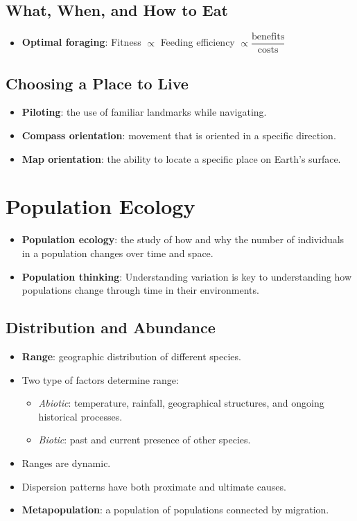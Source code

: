 \documentclass[12pt,a4paper]{article}
\begin{document}
\subsection{What, When, and How to Eat}
\begin{itemize}
    \item \textbf{Optimal foraging}: Fitness \(\propto\) Feeding efficiency \(\propto \dfrac{\text{benefits}}{\text{costs}}\)
\end{itemize}
\setcounter{subsection}{3}
\subsection{Choosing a Place to Live}
\begin{itemize}
    \item \textbf{Piloting}: the use of familiar landmarks while navigating.
    \item \textbf{Compass orientation}: movement that is oriented in a specific direction.
    \item \textbf{Map orientation}: the ability to locate a specific place on Earth's surface.
\end{itemize}

\clearpage
\section{Population Ecology}
\begin{itemize}
    \item \textbf{Population ecology}: the study of how and why the number of individuals in a population changes over time and space.
    \item \textbf{Population thinking}: Understanding variation is key to understanding how populations change through time in their environments.
\end{itemize}

\subsection{Distribution and Abundance}
\begin{itemize}
    \item \textbf{Range}: geographic distribution of different species.
    \item Two type of factors determine range:
        \begin{itemize}
            \item \textit{Abiotic}: temperature, rainfall, geographical structures, and ongoing historical processes.
            \item \textit{Biotic}: past and current presence of other species.
        \end{itemize}
    \item Ranges are dynamic.
    \item Dispersion patterns have both proximate and ultimate causes.
    \item \textbf{Metapopulation}: a population of populations connected by migration.
\end{itemize}
\end{document}
